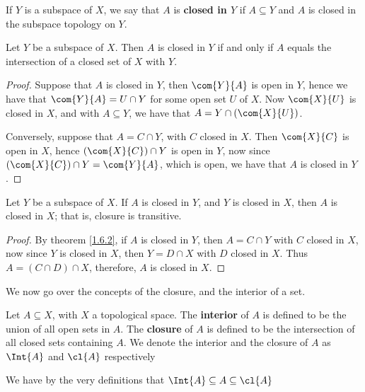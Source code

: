 \begin{definition}
    If $Y$ is a subspace of  $X$, we say that  $A$ is  \textbf{closed in $Y$} if
    $A \subseteq Y$ and  $A$ is closed in the subspace topology on  $Y$.
\end{definition}

\begin{theorem}\label{1.6.2}
    Let $Y$ be a subspace of  $X$. Then  $A$ is closed in  $Y$ if and only if
    $A$ equals the intersection of a closed set of  $X$ with  $Y$.
\end{theorem}
\begin{proof}
    Suppose that $A$ is closed in  $Y$, then  $\com{Y}{A}$ is open in  $Y$,
    hence we have that  $\com{Y}{A}=U \cap Y$ for some open set $U$ of  $X$. Now
    $\com{X}{U}$ is closed in  $X$, and with  $A \subseteq Y$, we have that
    $A=Y \cap (\com{X}{U})$.

    Conversely, suppose that $A=C \cap Y$, with  $C$ closed in  $X$. Then
    $\com{X}{C}$ is open in  $X$, hence  $(\com{X}{C}) \cap Y$ is open in  $Y$,
    now since  $(\com{X}{C}) \cap Y=\com{Y}{A}$, which is open, we have that  $A$
    is closed in  $Y$.
\end{proof}

\begin{theorem}\label{1.6.3}
    Let $Y$ be a subspace of  $X$. If  $A$ is closed in  $Y$, and  $Y$ is closed
    in  $X$, then  $A$ is closed in  $X$; that is, closure is transitive.
\end{theorem}
\begin{proof}
    By theorem \ref{1.6.2}, if $A$ is closed in  $Y$, then  $A=C \cap Y$ with
    $C$ closed in  $X$, now since  $Y$ is closed in  $X$, then  $Y=D \cap X$
    with  $D$ closed in  $X$. Thus  $A=(C \cap D) \cap X$, therefore,  $A$ is
    closed in  $X$.
\end{proof}

We now go over the concepts of the closure, and the interior of a set.

\begin{definition}
    Let $A \subseteq X$, with  $X$ a topological space. The  \textbf{interior}
    of $A$ is defined to be the union of all open sets in  $A$. The
    \textbf{closure} of $A$ is defined to be the intersection of all closed sets
    containing $A$. We denote the interior and the closure of  $A$ as  $\Int{A}$
    and  $\cl{A}$ respectively
\end{definition}

We have by the very definitions that $\Int{A} \subseteq A \subseteq \cl{A}$

